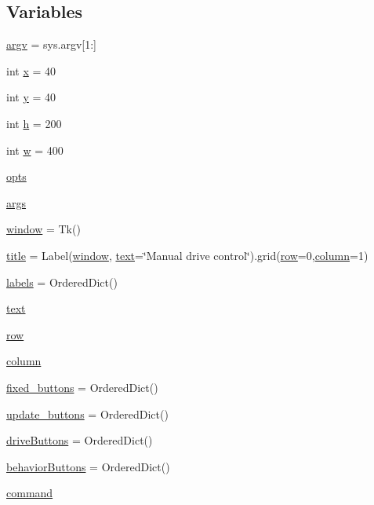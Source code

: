 \subsection*{Variables}
\begin{DoxyCompactItemize}
\item 
\hyperlink{namespacedrive__control__gui_a92766596d91107d696ea864c6cb9cd62}{argv} = sys.\+argv\mbox{[}1\+:\mbox{]}
\item 
int \hyperlink{namespacedrive__control__gui_a96e208e07db52926c25b8ae59399bd92}{x} = 40
\item 
int \hyperlink{namespacedrive__control__gui_af260d3b8db0d7fe75d2dd457382a1249}{y} = 40
\item 
int \hyperlink{namespacedrive__control__gui_a015e1fad080e1b240918bda96eeb0c3c}{h} = 200
\item 
int \hyperlink{namespacedrive__control__gui_ae5ecbe532a009a5045df11bcb6032913}{w} = 400
\item 
\hyperlink{namespacedrive__control__gui_adea65b77f32eda5a5c8277ca94a3d10a}{opts}
\item 
\hyperlink{namespacedrive__control__gui_ac441b65413c4dbde36a1a18bba13230e}{args}
\item 
\hyperlink{namespacedrive__control__gui_a65b2b897ed3828a7729a3b1ab25b7e88}{window} = Tk()
\item 
\hyperlink{namespacedrive__control__gui_adb8d5bbb1e535a1d27cdb44a7f167e1f}{title} = Label(\hyperlink{namespacedrive__control__gui_a65b2b897ed3828a7729a3b1ab25b7e88}{window}, \hyperlink{namespacedrive__control__gui_ab00d332aefc4a94abccab0faa842d87b}{text}=\char`\"{}Manual drive control\char`\"{}).grid(\hyperlink{namespacedrive__control__gui_ae1a4d2a2865661c5f27166a881cdc9ae}{row}=0,\hyperlink{namespacedrive__control__gui_ad87e3e1922e47bbecf9f5befa4a8a96d}{column}=1)
\item 
\hyperlink{namespacedrive__control__gui_a84069fee7713a950aef3ac43e08a8efd}{labels} = Ordered\+Dict()
\item 
\hyperlink{namespacedrive__control__gui_ab00d332aefc4a94abccab0faa842d87b}{text}
\item 
\hyperlink{namespacedrive__control__gui_ae1a4d2a2865661c5f27166a881cdc9ae}{row}
\item 
\hyperlink{namespacedrive__control__gui_ad87e3e1922e47bbecf9f5befa4a8a96d}{column}
\item 
\hyperlink{namespacedrive__control__gui_a6d8c80f6cfe16c1a434f16b00330c3d2}{fixed\+\_\+buttons} = Ordered\+Dict()
\item 
\hyperlink{namespacedrive__control__gui_ab25155b10730cc1a5e2a7013566a4fe7}{update\+\_\+buttons} = Ordered\+Dict()
\item 
\hyperlink{namespacedrive__control__gui_abc8d947482c1e9b8d00d4043ac63e752}{drive\+Buttons} = Ordered\+Dict()
\item 
\hyperlink{namespacedrive__control__gui_ae4ee1b19d3d4a97e09b41187b31602e0}{behavior\+Buttons} = Ordered\+Dict()
\item 
\hyperlink{namespacedrive__control__gui_a6aa91df395742208e117cc80ea87ea41}{command}
\end{DoxyCompactItemize}


